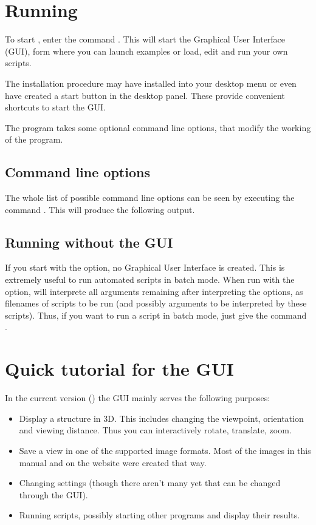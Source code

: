 \section{Running \pyformex}
\label{sec:running}
To start \pyf, enter the command . This will start the \pyf Graphical User Interface (GUI), form where you can launch examples or load, edit and run your own \pyf scripts.

The installation procedure may have installed \pyf into your desktop menu or even have created a start button in the desktop panel. These provide convenient shortcuts to start the \pyf GUI.

The \pyf program takes some optional command line options, that modify the working of the program.

\subsection{Command line options}
The whole list of possible command line options can be seen by executing the command . This will produce the following output.


\subsection{Running \pyFormex without the GUI}
If you start \pyf with the  option, no Graphical User Interface is created. This is extremely useful to run automated scripts in batch mode. When run with the  option, \pyf will interprete all arguments remaining after interpreting the options, as filenames of scripts to be run (and possibly arguments to be interpreted by these scripts).
Thus, if you want to run a \pyf script  in batch mode, just give the command .
 

\section{Quick tutorial for the \pyformex GUI}
\label{sec:gui-tutorial}
In the current version () the GUI mainly serves the following purposes:
\begin{itemize}
\item Display a structure in 3D. This includes changing the viewpoint, orientation and viewing distance. Thus you can interactively rotate, translate, zoom.
\item Save a view in one of the supported image formats. Most of the images in this manual and on the \pyformex{} website were created that way. 
\item Changing \pyformex settings (though there aren't many yet that can be changed through the GUI).
\item Running \pyformex scripts, possibly starting other programs and display their results.
\end{itemize}

